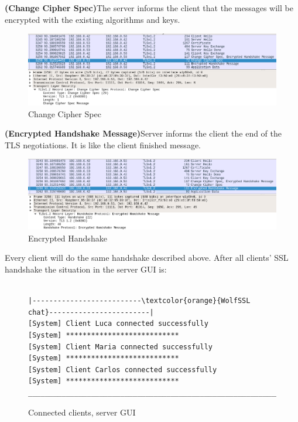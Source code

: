 \documentclass[a4paper,12pt]{article}
\begin{document}
\textbf{(Change Cipher Spec)}The server informs the client that the messages will be encrypted with the existing algorithms and keys.
\begin{figure}[H]
    \centering
    \includegraphics[scale=0.400]{./code/img/server-change-cipher.png}
    \caption{Change Cipher Spec}
\end{figure}
\textbf{(Encrypted Handshake Message)}Server informs the client the end of the TLS negotiations. It is like the client finished message.
\begin{figure}[H]
    \centering
    \includegraphics[scale=0.400]{./code/img/encrypted-handshake.png}
    \caption{Encrypted Handshake}
\end{figure}
Every client will do the same handshake described above.
After all clients' SSL handshake the situation in the server GUI is:
\begin{figure}[H]
\begin{Verbatim}[commandchars=\\\{\}]

|--------------------------\textcolor{orange}{WolfSSL chat}------------------------|
[System] Client Luca connected successfully                           
[System] ***************************                                        
[System] Client Maria connected successfully                           
[System] ***************************                                          
[System] Client Carlos connected successfully                           
[System] ***************************                                                                      
______________________________________________________________|
\end{Verbatim}
\caption{Connected clients, server GUI}
\end{figure}
\end{document}
